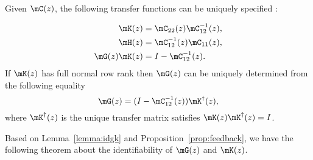   \begin{proposition}\label{prop:feedback}
    Given $\mC(z)$, the following transfer functions can be uniquely specified :

      \begin{align}
	\mK(z)&=\mC_{22}(z)\mC^{-1}_{12}(z),\nonumber\\
	\mH(z)&= \mC^{-1}_{12}(z)\mC_{11}(z),\nonumber\\
	\mG(z)\mK(z)&=I-\mC^{-1}_{12}(z).
	\label{eq:khg}
      \end{align}
    If $\mK(z)$ has full normal row rank then $\mG(z)$ can be uniquely determined from the following equality
    \begin{equation}
      \mG(z)=(I-\mC^{-1}_{12}(z))\mK^{\dagger}(z),
    \end{equation}  
    where $\mK^{\dagger}(z)$ is the unique transfer matrix satisfies $\mK(z)\mK^{\dagger}(z)=I$.
  \end{proposition}



  Based on Lemma~\ref{lemma:idgk} and Proposition~\ref{prop:feedback}, we have the following theorem about the identifiability of $\mG(z)$ and $\mK(z)$.

